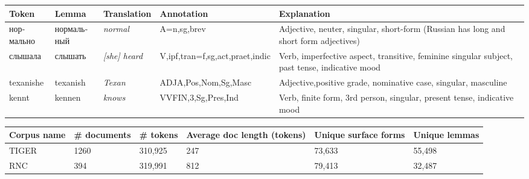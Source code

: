\documentclass[11pt,a4paper]{article}
\begin{document}


\begin{table*}[t]
    \label{table:sampleannotations}
    \centering
    \begin{tabularx}{6.8in}{|l|l|l|l|X|} \hline
       \textbf{Token} & \textbf{Lemma} & \textbf{Translation} & \textbf{Annotation} & \textbf{Explanation} \\ \hline
       \foreignlanguage{russian}{нормально} & \foreignlanguage{russian}{нормальный} & \textit{normal} & A=n,sg,brev & Adjective, neuter, singular, short-form (Russian has long and short form adjectives) \\ \hline
       \foreignlanguage{russian}{слышала} & \foreignlanguage{russian}{слышать} & \textit{[she]  heard} &
       V,ipf,tran=f,sg,act,praet,indic & Verb, imperfective aspect, transitive, feminine singular subject, past tense, indicative mood \\ \hline
       texanishe & texanish & \textit{Texan} & ADJA,Pos,Nom,Sg,Masc & Adjective,positive grade, nominative case, singular, masculine \\ \hline
       kennt & kennen & \textit{knows} & VVFIN,3,Sg,Pres,Ind & Verb, finite form, 3rd person, singular, present tense, indicative mood \\ \hline
    \end{tabularx}
\end{table*}


\begin{table*}[t]
    \label{table:corpusstats}
    \begin{tabularx}{6.8in}{|l|l|l|X|l|l|} \hline
        \textbf{Corpus name} & \textbf{\# documents} & \textbf{\# tokens} & \textbf{Average doc length (tokens)} & \textbf{Unique surface forms} & \textbf{Unique lemmas} \\ \hline
        TIGER & 1260 & 310,925 & 247 & 73,633 & 55,498 \\ \hline
        RNC & 394 & 319,991 & 812 & 79,413 & 32,487 \\ \hline
    \end{tabularx}
\end{table*}
\end{document}
